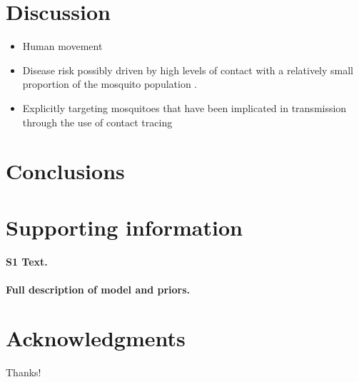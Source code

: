 \documentclass[10pt,letterpaper]{article}
\begin{document}
\section*{Discussion}

\begin{itemize}
\item Human movement \cite{Adams2009, Cosner2009a, Stoddard2009, Dalziel2013}
\item Disease risk possibly driven by high levels of contact with a relatively small proportion of the mosquito population \cite{Canyon1999}.
\item Explicitly targeting mosquitoes that have been implicated in transmission through the use of contact tracing \cite{Vazquez-Prokopec2017}
\end{itemize}

\section*{Conclusions}

\section*{Supporting information}

\paragraph*{S1 Text.}
\label{S1_Diag}
{\bf Full description of model and priors.}

\section*{Acknowledgments}

Thanks!

\nolinenumbers

%
%
% 



\end{document}
